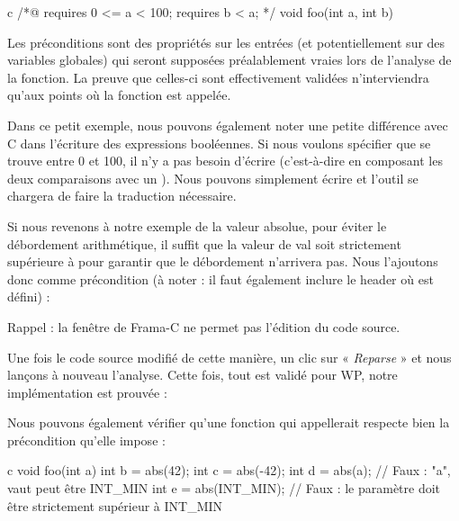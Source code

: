 \begin{CodeBlock}{c}
/*@
  requires 0 <= a < 100;
  requires b < a;
*/
void foo(int a, int b){
  
}
\end{CodeBlock}



Les préconditions sont des propriétés sur les entrées (et potentiellement sur
des variables globales) qui seront supposées préalablement vraies lors de 
l'analyse de la fonction. La preuve que celles-ci sont effectivement validées 
n'interviendra qu'aux points où la fonction est appelée.



Dans ce petit exemple, nous pouvons également noter une petite différence avec 
C dans l'écriture des expressions booléennes. Si nous voulons spécifier 
que  se trouve entre 0 et 100, il n'y a pas besoin d'écrire 
(c'est-à-dire en composant les deux comparaisons avec un \CodeInline{\&\&}). Nous 
pouvons simplement écrire  et l'outil se chargera de faire
la traduction nécessaire.



Si nous revenons à notre exemple de la valeur absolue, pour éviter le 
débordement arithmétique, il suffit que la valeur de val soit strictement 
supérieure à  pour garantir que le débordement n'arrivera pas.
Nous l'ajoutons donc comme précondition (à noter : il faut également
inclure le header où  est défini) :






\begin{Warning}
Rappel : la fenêtre de Frama-C ne permet pas l'édition du code source.
\end{Warning}


Une fois le code source modifié de cette manière, un clic sur « \textit{Reparse} » et 
nous lançons à nouveau l'analyse. Cette fois, tout est validé pour WP, notre 
implémentation est prouvée :





Nous pouvons également vérifier qu'une fonction qui appellerait  
respecte bien la précondition qu'elle impose :



\begin{CodeBlock}{c}
void foo(int a){
   int b = abs(42);
   int c = abs(-42);
   int d = abs(a);       // Faux : "a", vaut peut être INT_MIN
   int e = abs(INT_MIN); // Faux : le paramètre doit être strictement supérieur à INT_MIN
}
\end{CodeBlock}



